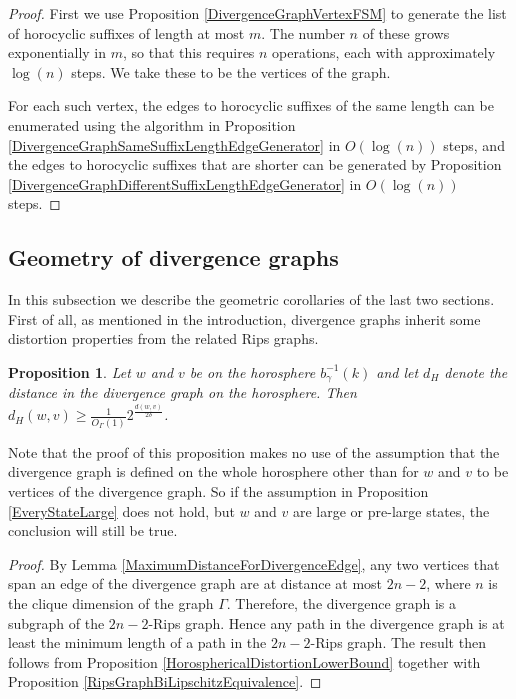\documentclass{amsart}
\newtheorem{proposition}[theorem]{Proposition}
\theoremstyle{definition}
\theoremstyle{remark}
\begin{document}
	\begin{proof}
		
		First we use Proposition \ref{DivergenceGraphVertexFSM} to generate the list of horocyclic suffixes of length at most $m$. The number $n$ of these grows exponentially in $m$, so that this requires $n$ operations, each with approximately $\log(n)$ steps. We take these to be the vertices of the graph.
		
		For each such vertex, the edges to horocyclic suffixes of the same length can be enumerated using the algorithm in Proposition \ref {DivergenceGraphSameSuffixLengthEdgeGenerator} in $O(\log(n))$ steps, and the edges to horocyclic suffixes that are shorter can be generated by Proposition \ref{DivergenceGraphDifferentSuffixLengthEdgeGenerator} in $O(\log(n))$ steps. 
	\end{proof}
	
	\subsection{Geometry of divergence graphs}
	\label{subsec:DivergenceGraphGeometry}
	
	In this subsection we describe the geometric corollaries of the last two sections. First of all, as mentioned in the introduction, divergence graphs inherit some distortion properties from the related Rips graphs.
	
	\begin{proposition}
		
		Let $w$ and $v$ be on the horosphere $b_{\gamma}^{-1}(k)$ and let $d_H$ denote the distance in the divergence graph on the horosphere. Then $d_H(w, v)\ge \frac{1}{O_\Gamma(1)}2^{\frac{d(w, v)}{2\delta}}$.
		
	\end{proposition}
	
	Note that the proof of this proposition makes no use of the assumption that the divergence graph is defined on the whole horosphere other than for $w$ and $v$ to be vertices of the divergence graph. So if the assumption in Proposition \ref{EveryStateLarge} does not hold, but $w$ and $v$ are large or pre-large states, the conclusion will still be true.
	
	\begin{proof}
		
		By Lemma \ref{MaximumDistanceForDivergenceEdge}, any two vertices that span an edge of the divergence graph are at distance at most $2n-2$, where $n$ is the clique dimension of the graph $\Gamma$. Therefore, the divergence graph is a subgraph of the $2n-2$-Rips graph. Hence any path in the divergence graph is at least the minimum length of a path in the $2n-2$-Rips graph. The result then follows from Proposition \ref{HorosphericalDistortionLowerBound} together with Proposition \ref{RipsGraphBiLipschitzEquivalence}.
	\end{proof}
	
\end{document}
